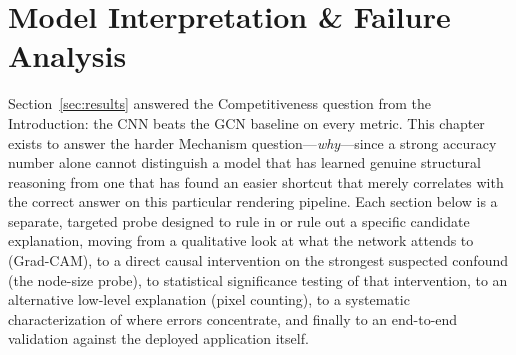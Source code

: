 \documentclass[11pt,letterpaper]{article}
\numberwithin{equation}{section}
\numberwithin{figure}{section}
\numberwithin{table}{section}
\begin{document}
\section{Model Interpretation \& Failure Analysis}
\label{ch:interpretation}
Section~\ref{sec:results} answered the Competitiveness question from the Introduction: the CNN beats the GCN baseline on every metric. This chapter exists to answer the harder Mechanism question---\emph{why}---since a strong accuracy number alone cannot distinguish a model that has learned genuine structural reasoning from one that has found an easier shortcut that merely correlates with the correct answer on this particular rendering pipeline. Each section below is a separate, targeted probe designed to rule in or rule out a specific candidate explanation, moving from a qualitative look at what the network attends to (Grad-CAM), to a direct causal intervention on the strongest suspected confound (the node-size probe), to statistical significance testing of that intervention, to an alternative low-level explanation (pixel counting), to a systematic characterization of where errors concentrate, and finally to an end-to-end validation against the deployed application itself.
\end{document}
